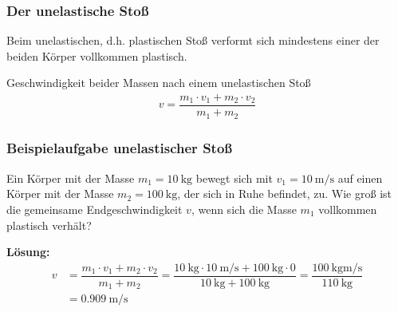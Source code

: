 \documentclass{article}
\begin{document}
\frame
{
  \frametitle{Der unelastische Stoß}
  Beim unelastischen, d.h. plastischen Stoß verformt sich mindestens einer der beiden Körper vollkommen plastisch.
  \begin{block}{Geschwindigkeit beider Massen nach einem unelastischen Stoß}
	\begin{align*}
	v=\dfrac{m_1\cdot v_1+m_2\cdot v_2}{m_1+m_2}
	\end{align*}
  \end{block}
}

\frame
{
{
  \frametitle{Beispielaufgabe unelastischer Stoß}
Ein Körper mit der Masse $m_1=\SI{10}{\kilogram}$ bewegt sich mit $v_1=\SI{10}{\meter\per\second}$ auf einen Körper mit der Masse $m_2=\SI{100}{\kilogram}$, der sich in Ruhe befindet, zu. Wie groß ist die gemeinsame Endgeschwindigkeit $v$, wenn sich die Masse $m_1$ vollkommen plastisch verhält?\\
}
{
\textbf{Lösung:}	
	\begin{align*}
	v&=\dfrac{m_1\cdot v_1+m_2\cdot v_2}{m_1+m_2}=\dfrac{\SI{10}{\kilogram}\cdot \SI{10}{\meter\per\second}+\SI{100}{\kilogram}\cdot 0}{\SI{10}{\kilogram}+\SI{100}{\kilogram}}=\dfrac{\SI{100}{\kilogram\meter\per\second}}{\SI{110}{\kilogram}}\\&=\SI{0,909}{\meter\per\second}
	\end{align*}
}
}
\end{document}
